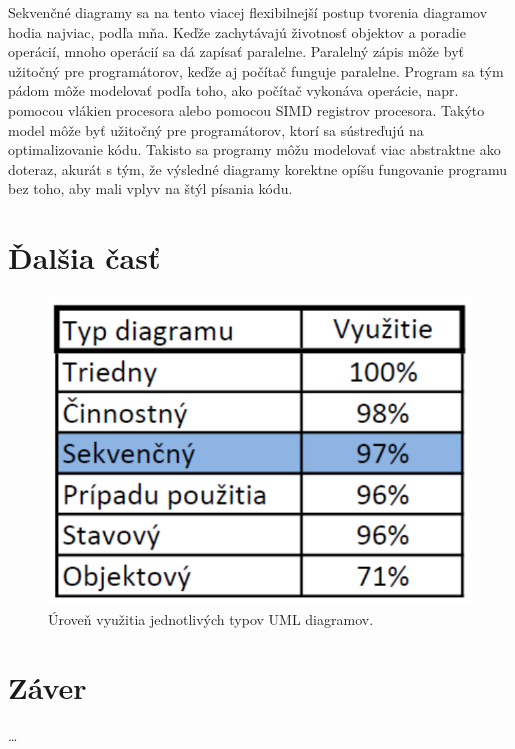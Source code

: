 \documentclass[10pt,slovak,a4paper]{article}
\begin{document}
\noindent Sekvenčné diagramy sa na tento viacej flexibilnejší postup tvorenia diagramov hodia najviac, podľa mňa. Keďže zachytávajú životnosť objektov a poradie operácií, mnoho operácií sa dá zapísať paralelne. Paralelný zápis môže byť užitočný pre programátorov, keďže aj počítač funguje paralelne. 
Program sa tým pádom môže modelovať podľa toho, ako počítač vykonáva operácie, napr. pomocou vlákien procesora alebo pomocou SIMD registrov procesora. Takýto model môže byť užitočný pre programátorov, ktorí sa sústreďujú na optimalizovanie kódu. 
Takisto sa programy môžu modelovať viac abstraktne ako doteraz, akurát s tým, že výsledné diagramy korektne opíšu fungovanie programu bez toho, aby mali vplyv na štýl písania kódu. \newline

\section{Ďalšia časť}

\begin{figure}[tbh]
\centering
\includegraphics[scale=0.7]{tab.pdf}
\caption{Úroveň využitia jednotlivých typov UML diagramov. \cite{reggio13}}
\end{figure}

\section{Záver}
\ldots




\end{document}
